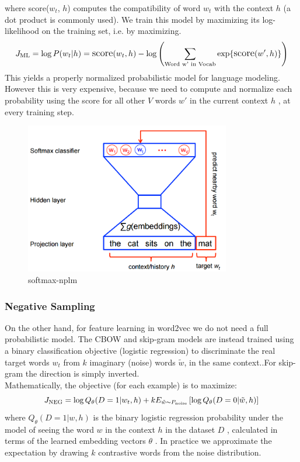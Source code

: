 where \text score({$w_t$}, $h$) computes the compatibility of word ${w_t}$ with the context ${h}$ (a dot product is commonly used). We train this model by maximizing its log-likelihood on the training set, i.e. by maximizing. 
 \begin{equation}
        \large 
           J_\text{ML} = \log P(w_t | h)
                       = \text{score} (w_t, h) -
                       \log \left( \sum_\text{Word w' in Vocab} \exp\{ \text{score} (w', h) \} \right)
 \end{equation}
 This yields a properly normalized probabilistic model for language modeling. However this is very expensive, because we need to compute and normalize each probability using the score for all other $V$  words $w'$ in the current context $h$ , at every training step.
\begin{figure}[H]%
    \center%
    \includegraphics[width=0.8\textwidth]{images/amira/softmax-nplm.png}%
    \caption[softmax]{softmax-nplm}\label{fig:softmax}%
  \end{figure}
  

\subsubsection{Negative Sampling}
On the other hand, for feature learning in word2vec we do not need a full probabilistic model. The CBOW and skip-gram models are instead trained using a binary classification objective (logistic regression) to discriminate the real target words $w_t$ from $k$ imaginary (noise) words $\tilde w$, in the same context..For skip-gram the direction is simply inverted.\\ Mathematically, the objective (for each example) is to maximize:
  \begin{equation}
     \large
        J_\text{NEG} = \log Q_\theta(D=1 |w_t, h) +
        k {\space{E}}_{\tilde w \sim P_\text{noise}}
        \left[ \log Q_\theta(D = 0 |\tilde w, h) \right]
  \end{equation}
  where $Q_\theta(D=1 | w, h)$  is the binary logistic regression probability under the model of seeing the word $w$ in the context $h$ in the dataset $D$ , calculated in terms of the learned embedding vectors $\theta$ . In practice we approximate the expectation by drawing $k$  contrastive words from the noise distribution.


